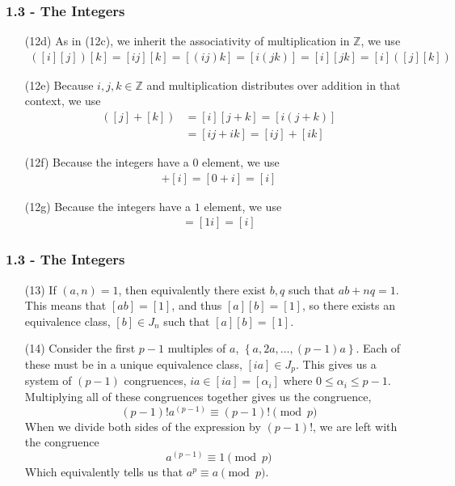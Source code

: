 \documentclass{beamer}
\begin{document}
\begin{frame}
\frametitle{1.3 - The Integers}
\small
\begin{enumerate}
	\item[(12d)] As in (12c), we inherit the associativity of multiplication in $\mathbb Z$, we use
	\begin{align*}
	\left([i][j]\right)[k] = [ij][k] = [(ij)k] = [i(jk)] = [i][jk] = [i]\left([j][k]\right)
	\end{align*}
	\item[(12e)] Because $i,j,k\in\mathbb Z$ and multiplication distributes over addition in that context, we use
	\begin{align*}
	[i]\left([j] + [k]\right) &= [i][j+k] = [i(j+k)] \\
	&= [ij + ik] = [ij] + [ik]
	\end{align*}
	\item[(12f)] Because the integers have a $0$ element, we use
	\begin{align*}
	[0] + [i] = [0 + i] = [i]
	\end{align*}
	\item[(12g)] Because the integers have a $1$ element, we use
	\begin{align*}
	[1][i] = [1i] = [i]
	\end{align*}
\end{enumerate}
\end{frame}
\begin{frame}
\frametitle{1.3 - The Integers}
\small
\begin{enumerate}
	\item[(13)] If $(a,n) = 1$, then equivalently there exist $b, q$ such that $ab + nq = 1$. This means that $[ab] = [1]$, and thus $[a][b] = [1]$, so there exists an equivalence class, $[b]\in J_n$ such that $[a][b] = [1]$.
	\item[(14)] Consider the first $p-1$ multiples of $a$, $\left\{a, 2a, \ldots, (p-1)a\right\}$. Each of these must be in a unique equivalence class, $[ia]\in J_p$. This gives us a system of $(p-1)$ congruences, $ia\in[ia]=[\alpha_i]$ where $0\leq \alpha_i\leq p-1$. Multiplying all of these congruences together gives us the congruence,
	\begin{equation*}
	(p-1)!a^{(p-1)}\equiv (p-1)!\pmod{p}
	\end{equation*}
	When we divide both sides of the expression by $(p-1)!$, we are left with the congruence
	\begin{equation*}
	a^{(p-1)} \equiv 1\pmod{p}
	\end{equation*}
	Which equivalently tells us that $a^p\equiv a\pmod{p}$.
\end{enumerate}
\end{frame}
\end{document}
